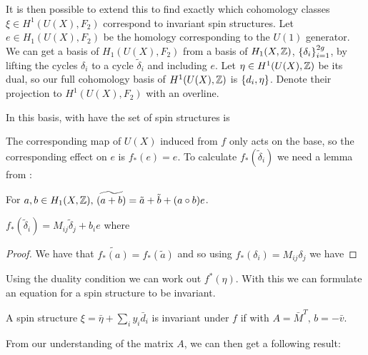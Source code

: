 \documentclass{article}
\begin{document}
It is then possible to extend this to find exactly which cohomology classes $\xi \in H^1(U(X),F_2)$ correspond to invariant spin structures. Let $e \in H_1(U(X),F_2)$ be the homology corresponding to the $U(1)$ generator. We can get a basis of $H_1(U(X),F_2)$ from a basis of $H_1(X,\mathbb{Z})$, $\left\{ \delta_i \right\}_{i=1}^{2g}$, by lifting the cycles $\delta_i$ to a cycle $\tilde{\delta}_i$ and including $e$. 
Let $\eta \in H^1(U(X),\mathbb{Z})$ be its dual, so our full cohomology basis of $H^1(U(X),\mathbb{Z})$ is $\left\{ d_i,\eta \right\}$. Denote their projection to $H^1(U(X),F_2)$ with an overline. 
\begin{remark}
	In this basis, with have the set of spin structures is 
\end{remark}
The corresponding map of $U(X)$ induced from $f$ only acts on the base, so the corresponding effect on $e$ is $f_\ast(e)=e$. 
To calculate $f_\ast(\tilde{\delta}_i)$ we need a lemma from \cite{Johnson1980}:
\begin{lemma}
	For $a,b \in H_1(X,\mathbb{Z}), \, \widetilde{(a+b)} = \tilde{a} + \tilde{b} + (a \circ b)e$. 
\end{lemma}
\begin{corollary}
	$f_\ast(\tilde{\delta}_i) = M_{ij} \tilde{\delta}_j + b_i e$ where 
\end{corollary}
\begin{proof}
	We have that $\tilde{f_\ast(a)} = f_\ast(\tilde{a})$ and so using $f_\ast(\delta_i) = M_{ij} \delta_j$ we have 
\end{proof}
Using the duality condition we can work out $f^\ast(\eta)$. With this we can formulate an equation for a spin structure to be invariant. 
\begin{theorem}
	A spin structure $\xi = \bar{\eta} + \sum_i y_i \bar{d}_i$ is invariant under $f$ if 
with $A=\bar{M}^T, \, b=-\bar{v}$.   
\end{theorem}

From our understanding of the matrix $A$, we can then get a following result:
\end{document}
